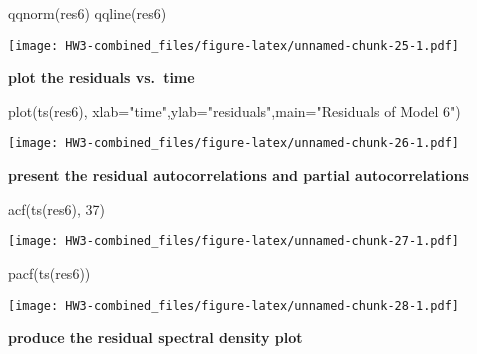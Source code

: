 \documentclass[
]{article}
\newenvironment{Shaded}{\begin{snugshade}}{\end{snugshade}}
\newcommand{\AttributeTok}[1]{\textcolor[rgb]{0.77,0.63,0.00}{#1}}
\newcommand{\DecValTok}[1]{\textcolor[rgb]{0.00,0.00,0.81}{#1}}
\newcommand{\FunctionTok}[1]{\textcolor[rgb]{0.00,0.00,0.00}{#1}}
\newcommand{\NormalTok}[1]{#1}
\newcommand{\StringTok}[1]{\textcolor[rgb]{0.31,0.60,0.02}{#1}}
\begin{document}
\begin{Shaded}
\begin{Highlighting}[]
\FunctionTok{qqnorm}\NormalTok{(res6)}
\FunctionTok{qqline}\NormalTok{(res6)}
\end{Highlighting}
\end{Shaded}

\texttt{[image: HW3-combined\_files/figure-latex/unnamed-chunk-25-1.pdf]}

\textbf{plot the residuals vs.~time}

\begin{Shaded}
\begin{Highlighting}[]
\FunctionTok{plot}\NormalTok{(}\FunctionTok{ts}\NormalTok{(res6), }\AttributeTok{xlab=}\StringTok{"time"}\NormalTok{,}\AttributeTok{ylab=}\StringTok{"residuals"}\NormalTok{,}\AttributeTok{main=}\StringTok{"Residuals of Model 6"}\NormalTok{)}
\end{Highlighting}
\end{Shaded}

\texttt{[image: HW3-combined\_files/figure-latex/unnamed-chunk-26-1.pdf]}

\textbf{present the residual autocorrelations and partial
autocorrelations}

\begin{Shaded}
\begin{Highlighting}[]
\FunctionTok{acf}\NormalTok{(}\FunctionTok{ts}\NormalTok{(res6), }\DecValTok{37}\NormalTok{)}
\end{Highlighting}
\end{Shaded}

\texttt{[image: HW3-combined\_files/figure-latex/unnamed-chunk-27-1.pdf]}

\begin{Shaded}
\begin{Highlighting}[]
\FunctionTok{pacf}\NormalTok{(}\FunctionTok{ts}\NormalTok{(res6))}
\end{Highlighting}
\end{Shaded}

\texttt{[image: HW3-combined\_files/figure-latex/unnamed-chunk-28-1.pdf]}

\textbf{produce the residual spectral density plot}
\end{document}
